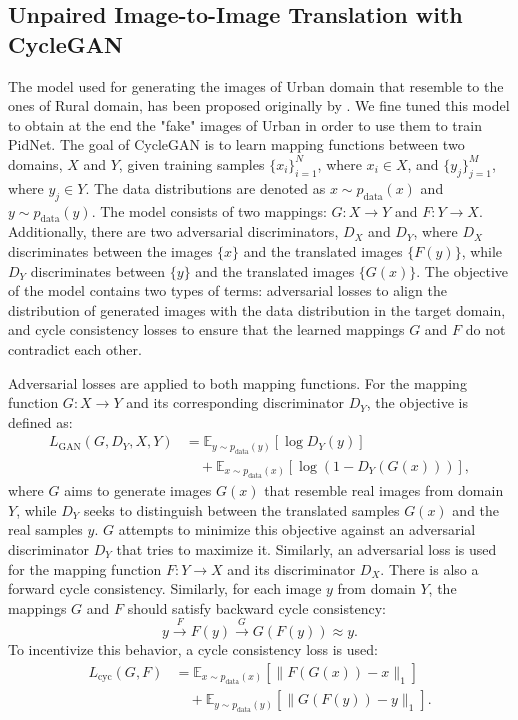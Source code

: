 \documentclass[10pt,twocolumn,letterpaper]{article}
\begin{document}
\subsection{Unpaired Image-to-Image Translation with CycleGAN}
The model used for generating the images of Urban domain that resemble to the ones of Rural domain, has been proposed originally by \cite{zhu2020cyclegan}. We fine tuned this model to obtain at the end the "fake" images of Urban in order to use them to train PidNet.
The goal of CycleGAN is to learn mapping functions between two domains, \(X\) and \(Y\), given training samples \(\{ x_i \}_{i=1}^N\), where \(x_i \in X\), and \(\{ y_j \}_{j=1}^M\), where \(y_j \in Y\). The data distributions are denoted as \(x \sim p_{\text{data}}(x)\) and \(y \sim p_{\text{data}}(y)\). The model consists of two mappings: \(G: X \rightarrow Y\) and \(F: Y \rightarrow X\). Additionally, there are two adversarial discriminators, \(D_X\) and \(D_Y\), where \(D_X\) discriminates between the images \(\{ x \}\) and the translated images \(\{ F(y) \}\), while \(D_Y\) discriminates between \(\{ y \}\) and the translated images \(\{ G(x) \}\). The objective of the model contains two types of terms: adversarial losses to align the distribution of generated images with the data distribution in the target domain, and cycle consistency losses to ensure that the learned mappings \(G\) and \(F\) do not contradict each other.

Adversarial losses are applied to both mapping functions. For the mapping function \(G: X \rightarrow Y\) and its corresponding discriminator \(D_Y\), the objective is defined as:
\begin{align}
L_{\text{GAN}}(G, D_Y, X, Y) &= \mathbb{E}_{y \sim p_{\text{data}}(y)} \left[ \log D_Y(y) \right] \nonumber \\
&\quad + \mathbb{E}_{x \sim p_{\text{data}}(x)} \left[ \log(1 - D_Y(G(x))) \right],
\end{align}
where \(G\) aims to generate images \(G(x)\) that resemble real images from domain \(Y\), while \(D_Y\) seeks to distinguish between the translated samples \(G(x)\) and the real samples \(y\). \(G\) attempts to minimize this objective against an adversarial discriminator \(D_Y\) that tries to maximize it.
Similarly, an adversarial loss is used for the mapping function \(F: Y \rightarrow X\) and its discriminator \(D_X\).
There is also a forward cycle consistency. Similarly, for each image \( y \) from domain \( Y \), the mappings \( G \) and \( F \) should satisfy backward cycle consistency:
\[
y \xrightarrow{F} F(y) \xrightarrow{G} G(F(y)) \approx y.
\]
To incentivize this behavior, a cycle consistency loss is used:
\begin{align}
L_{\text{cyc}}(G, F) &= \mathbb{E}_{x \sim p_{\text{data}}(x)} \left[ \| F(G(x)) - x \|_1 \right] \nonumber \\
&\quad + \mathbb{E}_{y \sim p_{\text{data}}(y)} \left[ \| G(F(y)) - y \|_1 \right].
\end{align}
\end{document}
